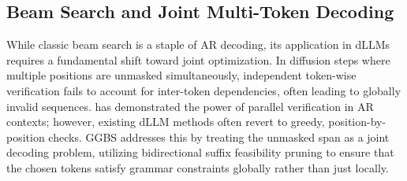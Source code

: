 \subsection{Beam Search and Joint Multi-Token Decoding}
While classic beam search is a staple of AR decoding, its application in dLLMs requires a fundamental shift toward joint optimization. In diffusion steps where multiple positions are unmasked simultaneously, independent token-wise verification fails to account for inter-token dependencies, often leading to globally invalid sequences. \citet{leviathan2023fastinferencetransformersspeculative} has demonstrated the power of parallel verification in AR contexts; however, existing dLLM methods often revert to greedy, position-by-position checks. GGBS addresses this by treating the unmasked span as a joint decoding problem, utilizing bidirectional suffix feasibility pruning to ensure that the chosen tokens satisfy grammar constraints globally rather than just locally.





